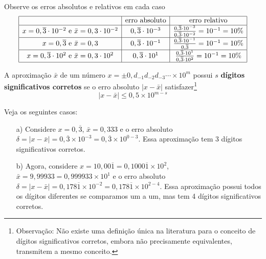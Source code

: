 \documentclass[main.tex]{subfiles}
\begin{document}
\begin{ex}
Observe os erros absolutos e relativos em cada caso
$$
\begin{array}{|c|c|c|}
\hline
&\hbox{erro absoluto}&\hbox{erro relativo}\\
\hline
x=0,\overline{3}\cdot 10^{-2}\ \hbox{e}\ \bar{x}=0,3\cdot 10^{-2}&0,\overline{3}\cdot 10^{-3}&\frac{0,\overline{3}\cdot 10^{-3}}{0,\overline{3}\cdot 10^{-2}}=10^{-1}=10\%\\
\hline
x=0,\overline{3}\ \hbox{e}\ \bar{x}=0,3&0,\overline{3}\cdot 10^{-1}&\frac{0,\overline{3}\cdot 10^{-1}}{0,\overline{3}}=10^{-1}=10\%\\
\hline
x=0,\overline{3}\cdot 10^{2}\ \hbox{e}\ \bar{x}=0,3\cdot 10^{2}&0,\overline{3}\cdot 10^{1}&\frac{0,\overline{3}\cdot 10^{1}}{0,\overline{3}\cdot 10^{2}}=10^{-1}=10\%\\
\hline
\end{array}
$$
\end{ex}



\begin{defn}
A aproximação $\bar{x}$ de um número $x = \pm 0,d_{-1}d_{-2}d_{-3}\cdots \times 10^m$ possui $s$ {\bf dígitos significativos corretos} se o erro absoluto $|x-\bar{x}|$ satisfazer\footnote{Observação: Não existe uma definição única na literatura para o conceito de dígitos significativos corretos, embora não precisamente equivalentes, transmitem a mesmo conceito.}
$$
|x-\bar{x}|\leq 0,5\times 10^{m-s}
$$
\end{defn}

\begin{ex} Veja os seguintes casos:
\begin{itemize}
\item[a)] Considere $x=0,\overline{3}$, $\bar{x}=0,333$ e o erro absoluto $\delta=|x-\bar{x}|=0,\overline{3}\times 10^{-3}=0,\overline{3}\times 10^{0-3}$. Essa aproximação tem 3 dígitos significativos corretos.
\item[b)] Agora, considere $x=10,00\overline{1}=0,1000\overline{1}\times 10^{2}$, $\bar{x}=9,99933=0,999933\times 10^1$ e o erro absoluto $\delta=|x-\bar{x}|=0,178\overline{1}\times 10^{-2}=0,178\overline{1}\times 10^{2-4}$. Essa aproximação possui todos os dígitos diferentes se comparamos um a um, mas tem 4 dígitos significativos corretos.
\end{itemize}
\end{ex}
\end{document}
